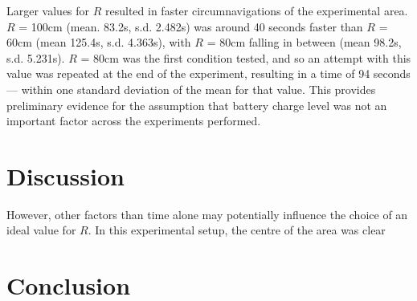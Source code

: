 \documentclass[a4paper,12pt]{article}
\begin{document}

Larger values for $R$ resulted in faster circumnavigations of the experimental area. $R$ = 100cm (mean. 83.2s, s.d. 2.482s) was around 40 seconds faster than $R$ = 60cm (mean 125.4s, s.d. 4.363s), with $R$ = 80cm falling in between (mean 98.2s, s.d. 5.231s). $R$ = 80cm was the first condition tested, and so an attempt with this value was repeated at the end of the experiment, resulting in a time of 94 seconds --- within one standard deviation of the mean for that value. This provides preliminary evidence for the assumption that battery charge level was not an important factor across the experiments performed.

\section{Discussion}

However, other factors than time alone may potentially influence the choice of an ideal value for $R$. In this experimental setup, the centre of the area was clear


\section{Conclusion}
\end{document}
